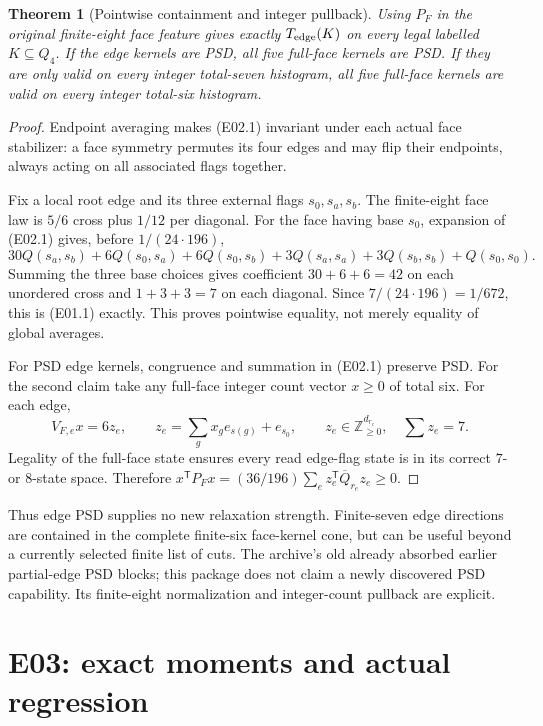 \documentclass[11pt]{article}
\newtheorem{theorem}{Theorem}
\newcommand{\file}[1]{\texttt{\detokenize{#1}}}
\begin{document}
\begin{theorem}[Pointwise containment and integer pullback]\label{thm:lift}
Using \(P_F\) in the original finite-eight face feature gives exactly
\(T_{\rm edge}(K)\) on every legal labelled \(K\subseteq Q_4\).
If the edge kernels are PSD, all five full-face kernels are PSD.
If they are only valid on every integer total-seven histogram, all
five full-face kernels are valid on every integer total-six histogram.
\end{theorem}
\begin{proof}
Endpoint averaging makes (E02.1) invariant under each actual face
stabilizer: a face symmetry permutes its four edges and may flip their
endpoints, always acting on all associated flags together.

Fix a local root edge and its three external flags \(s_0,s_a,s_b\).
The finite-eight face law is \(5/6\) cross plus \(1/12\) per diagonal.
For the face having base \(s_0\), expansion of (E02.1) gives, before
\(1/(24\cdot196)\),
\[
 30Q(s_a,s_b)+6Q(s_0,s_a)+6Q(s_0,s_b)
 +3Q(s_a,s_a)+3Q(s_b,s_b)+Q(s_0,s_0).
\]
Summing the three base choices gives coefficient \(30+6+6=42\)
on each unordered cross and \(1+3+3=7\) on each diagonal.
Since \(7/(24\cdot196)=1/672\), this is (E01.1) exactly.
This proves pointwise equality, not merely equality of global averages.

For PSD edge kernels, congruence and summation in (E02.1) preserve PSD.
For the second claim take any full-face integer count vector \(x\ge0\)
of total six.  For each edge,
\[
 V_{F,e}x=6z_e,\qquad
 z_e=\sum_gx_ge_{s(g)}+e_{s_0},\qquad
 z_e\in\mathbb Z_{\ge0}^{d_{r_e}},\quad\sum z_e=7.
\]
Legality of the full-face state ensures every read edge-flag state is
in its correct \(7\)- or \(8\)-state space.
Therefore \(x^{\mathsf T}P_Fx=(36/196)\sum_e
z_e^{\mathsf T}\overline Q_{r_e}z_e\ge0\).
\end{proof}

Thus edge PSD supplies no new relaxation strength.  Finite-seven edge
directions are contained in the complete finite-six face-kernel cone,
but can be useful beyond a currently selected finite list of cuts.
The archive's old \file{fold_old.py} already absorbed earlier partial-edge
PSD blocks; this package does not claim a newly discovered PSD capability.
Its finite-eight normalization and integer-count pullback are explicit.

\section{E03: exact moments and actual regression}
\end{document}
